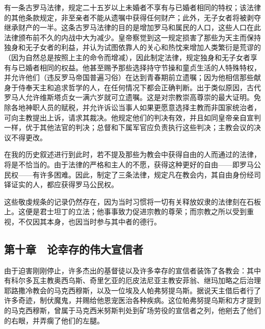 有一条古罗马法律，规定二十五岁以上未婚者不享有与已婚者相同的特权；该法律的其他条款规定，非至亲者不能从遗嘱中获得任何财产；此外，无子女者将被剥夺继承财产的一半。这条古罗马法律的目的是增加罗马和属民的人口，这些人口在此法律颁布前不久的内战中大为减少。皇帝察觉到这一规定损害了那些为天主而保持独身和无子女者的利益，并认为试图依靠人的关心和热忱来增加人类繁衍是荒谬的（因为自然总是按照上主的命令而增减），因此制定法律，规定独身和无子女者享有与已婚者相同的权益。他甚至赐予那些选择持守节操和童贞生活的人特殊特权，并允许他们（违反罗马帝国普遍习俗）在达到青春期前立遗嘱；因为他相信那些献身于侍奉天主和追求哲学的人，在任何情况下都会正确判断。出于类似原因，古代罗马人允许维斯塔贞女一满六岁就可立遗嘱。这是对宗教崇高尊崇的最大证明。免除各地神职人员的赋税，并允许诉讼当事人如果更愿意选择主教而非国家统治者，可向主教提出上诉，请求其裁决。他规定他们的判决有效，并且如同皇帝亲自宣判一样，优于其他法官的判决；总督和下属军官应负责执行这些判决；主教会议的决议不得更改。\par

在我的历史叙述进行到此时，若不提及那些为教会中获得自由的人而通过的法律，将是不恰当的。由于法律的严格和主人的不愿，获得这种更好的自由——即罗马公民权——有许多困难。因此，制定了三条法律，规定凡在教会内，其自由身份经司铎证实的人，都应获得罗马公民权。\par

这些敬虔规条的记录仍然存在，因为当时习惯将一切有关释放奴隶的法律刻在石板上。这便是君士坦丁的立法；他事事致力促进宗教的尊荣；而宗教之所以受到重视，不仅因其本身，也因当时参与其中者的德行。\par


\subsection{第十章　论幸存的伟大宣信者}

由于迫害刚刚停止，许多杰出的基督徒以及许多幸存的宣信者装饰了各教会：其中有科尔多瓦主教奥西乌斯、奇里乞亚的厄皮法尼亚主教安菲翁、继玛加略之后治理耶路撒冷教会的马克西穆斯，以及一位埃及人帕弗努提乌斯。据说天主借后者行了许多奇迹，制伏魔鬼，并赐给他恩宠医治各种疾病。这位帕弗努提乌斯和方才提到的马克西穆斯，曾属于马克西米努斯判处到矿场劳役的宣信者之列，他剜去了他们的右眼，并弄瘸了他们的左腿。\par


